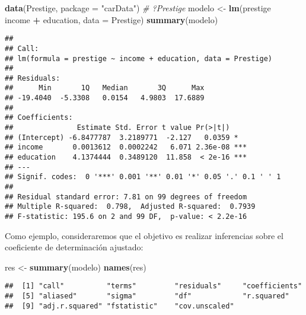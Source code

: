 \documentclass[]{book}
\newenvironment{Shaded}{\begin{snugshade}}{\end{snugshade}}
\newcommand{\KeywordTok}[1]{\textcolor[rgb]{0.13,0.29,0.53}{\textbf{#1}}}
\newcommand{\DataTypeTok}[1]{\textcolor[rgb]{0.13,0.29,0.53}{#1}}
\newcommand{\StringTok}[1]{\textcolor[rgb]{0.31,0.60,0.02}{#1}}
\newcommand{\CommentTok}[1]{\textcolor[rgb]{0.56,0.35,0.01}{\textit{#1}}}
\newcommand{\OperatorTok}[1]{\textcolor[rgb]{0.81,0.36,0.00}{\textbf{#1}}}
\newcommand{\NormalTok}[1]{#1}
\theoremstyle{break}
\theoremstyle{definition}
\theoremstyle{definition}
\theoremstyle{definition}
\theoremstyle{remark}
\begin{document}
\begin{Shaded}
\begin{Highlighting}[]
\KeywordTok{data}\NormalTok{(Prestige, }\DataTypeTok{package =} \StringTok{"carData"}\NormalTok{)}
\CommentTok{# ?Prestige}
\NormalTok{modelo <-}\StringTok{ }\KeywordTok{lm}\NormalTok{(prestige }\OperatorTok{~}\StringTok{ }\NormalTok{income }\OperatorTok{+}\StringTok{ }\NormalTok{education, }\DataTypeTok{data =}\NormalTok{ Prestige)}
\KeywordTok{summary}\NormalTok{(modelo)}
\end{Highlighting}
\end{Shaded}

\begin{verbatim}
## 
## Call:
## lm(formula = prestige ~ income + education, data = Prestige)
## 
## Residuals:
##      Min       1Q   Median       3Q      Max 
## -19.4040  -5.3308   0.0154   4.9803  17.6889 
## 
## Coefficients:
##               Estimate Std. Error t value Pr(>|t|)    
## (Intercept) -6.8477787  3.2189771  -2.127   0.0359 *  
## income       0.0013612  0.0002242   6.071 2.36e-08 ***
## education    4.1374444  0.3489120  11.858  < 2e-16 ***
## ---
## Signif. codes:  0 '***' 0.001 '**' 0.01 '*' 0.05 '.' 0.1 ' ' 1
## 
## Residual standard error: 7.81 on 99 degrees of freedom
## Multiple R-squared:  0.798,  Adjusted R-squared:  0.7939 
## F-statistic: 195.6 on 2 and 99 DF,  p-value: < 2.2e-16
\end{verbatim}

Como ejemplo, consideraremos que el objetivo es realizar inferencias
sobre el coeficiente de determinación ajustado:

\begin{Shaded}
\begin{Highlighting}[]
\NormalTok{res <-}\StringTok{ }\KeywordTok{summary}\NormalTok{(modelo)}
\KeywordTok{names}\NormalTok{(res)}
\end{Highlighting}
\end{Shaded}

\begin{verbatim}
##  [1] "call"          "terms"         "residuals"     "coefficients" 
##  [5] "aliased"       "sigma"         "df"            "r.squared"    
##  [9] "adj.r.squared" "fstatistic"    "cov.unscaled"
\end{verbatim}

\begin{Shaded}
\end{Shaded}
\end{document}
